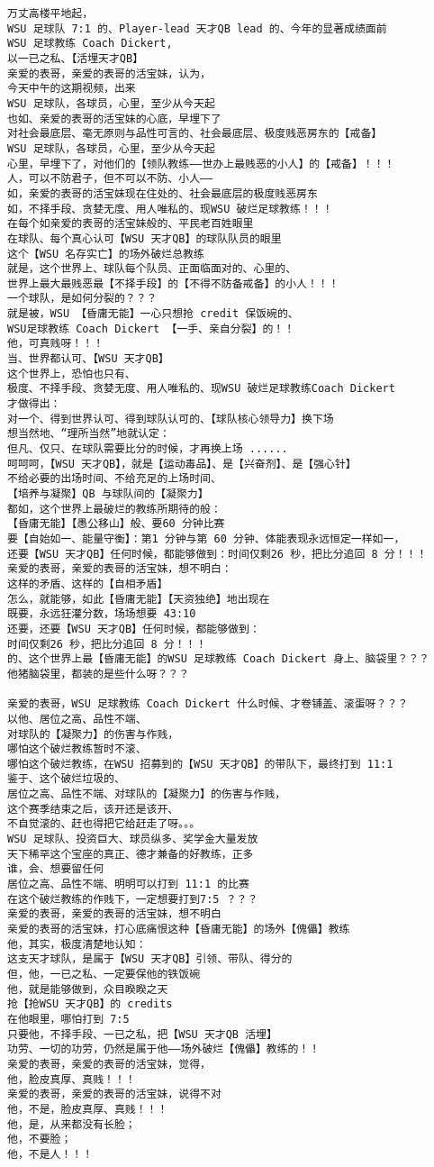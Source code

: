 \documentclass[9pt, b5paper]{article}
\begin{document}
\begin{verbatim}
万丈高楼平地起，
WSU 足球队 7:1 的、Player-lead 天才QB lead 的、今年的显著成绩面前
WSU 足球教练 Coach Dickert,
以一已之私、【活埋天才QB】
亲爱的表哥，亲爱的表哥的活宝妹，认为，
今天中午的这期视频，出来
WSU 足球队，各球员，心里，至少从今天起
也如、亲爱的表哥的活宝妹的心底，早埋下了
对社会最底层、毫无原则与品性可言的、社会最底层、极度贱恶房东的【戒备】
WSU 足球队，各球员，心里，至少从今天起
心里，早埋下了，对他们的【领队教练——世办上最贱恶的小人】的【戒备】！！！
人，可以不防君子，但不可以不防、小人——
如，亲爱的表哥的活宝妹现在住处的、社会最底层的极度贱恶房东
如，不择手段、贪婪无度、用人唯私的、现WSU 破烂足球教练！！！
在每个如亲爱的表哥的活宝妹般的、平民老百姓眼里
在球队、每个真心认可【WSU 天才QB】的球队队员的眼里
这个【WSU 名存实亡】的场外破烂总教练
就是，这个世界上、球队每个队员、正面临面对的、心里的、
世界上最大最贱恶最【不择手段】的【不得不防备戒备】的小人！！！
一个球队，是如何分裂的？？？
就是被，WSU 【昏庸无能】一心只想抢 credit 保饭碗的、
WSU足球教练 Coach Dickert 【一手、亲自分裂】的！！
他，可真贱呀！！！
当、世界都认可、【WSU 天才QB】
这个世界上，恐怕也只有、
极度、不择手段、贪婪无度、用人唯私的、现WSU 破烂足球教练Coach Dickert
才做得出：
对一个、得到世界认可、得到球队认可的、【球队核心领导力】换下场
想当然地、“理所当然”地就认定：
但凡、仅只、在球队需要比分的时候，才再换上场 ......
呵呵呵，【WSU 天才QB】，就是【运动毒品】、是【兴奋剂】、是【强心针】
不给必要的出场时间、不给充足的上场时间、
【培养与凝聚】QB 与球队间的【凝聚力】
都如，这个世界上最破烂的教练所期待的般：
【昏庸无能】【愚公移山】般、要60 分钟比赛
要【自始如一、能量守衡】：第1 分钟与第 60 分钟、体能表现永远恒定一样如一，
还要【WSU 天才QB】任何时候，都能够做到：时间仅剩26 秒，把比分追回 8 分！！！
亲爱的表哥，亲爱的表哥的活宝妹，想不明白：
这样的矛盾、这样的【自相矛盾】
怎么，就能够，如此【昏庸无能】【天资独绝】地出现在
既要，永远狂灌分数，场场想要 43:10
还要，还要【WSU 天才QB】任何时候，都能够做到：
时间仅剩26 秒，把比分追回 8 分！！！
的、这个世界上最【昏庸无能】的WSU 足球教练 Coach Dickert 身上、脑袋里？？？
他猪脑袋里，都装的是些什么呀？？？

亲爱的表哥，WSU 足球教练 Coach Dickert 什么时候、才卷铺盖、滚蛋呀？？？
以他、居位之高、品性不端、
对球队的【凝聚力】的伤害与作贱，
哪怕这个破烂教练暂时不滚、
哪怕这个破烂教练，在WSU 招募到的【WSU 天才QB】的带队下，最终打到 11:1
鉴于、这个破烂垃圾的、
居位之高、品性不端、对球队的【凝聚力】的伤害与作贱，
这个赛季结束之后，该开还是该开、
不自觉滚的、赶也得把它给赶走了呀。。。
WSU 足球队、投资巨大、球员纵多、奖学金大量发放
天下稀罕这个宝座的真正、德才兼备的好教练，正多
谁，会、想要留任何
居位之高、品性不端、明明可以打到 11:1 的比赛
在这个破烂教练的作贱下，一定想要打到7:5 ？？？
亲爱的表哥，亲爱的表哥的活宝妹，想不明白
亲爱的表哥的活宝妹，打心底痛恨这种【昏庸无能】的场外【傀儡】教练
他，其实，极度清楚地认知：
这支天才球队，是属于【WSU 天才QB】引领、带队、得分的
但，他，一已之私、一定要保他的铁饭碗
他，就是能够做到，众目睽睽之天
抢【抢WSU 天才QB】的 credits
在他眼里，哪怕打到 7:5
只要他，不择手段、一已之私，把【WSU 天才QB 活埋】
功劳、一切的功劳，仍然是属于他——场外破烂【傀儡】教练的！！
亲爱的表哥，亲爱的表哥的活宝妹，觉得，
他，脸皮真厚、真贱！！！
亲爱的表哥，亲爱的表哥的活宝妹，说得不对
他，不是，脸皮真厚、真贱！！！
他，是，从来都没有长脸；
他，不要脸；
他，不是人！！！


\end{verbatim}
\end{document}
